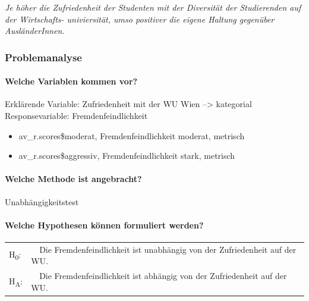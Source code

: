 \documentclass[]{article}
\providecommand{\tightlist}{%
  \setlength{\itemsep}{0pt}\setlength{\parskip}{0pt}}
\let\oldparagraph\paragraph
\renewcommand{\paragraph}[1]{\oldparagraph{#1}\mbox{}}
\begin{document}
\emph{Je höher die Zufriedenheit der Studenten mit der Diversität der
Studierenden auf der Wirtschafts- univiersität, umso positiver die
eigene Haltung gegenüber AusländerInnen.}

\subsubsection{Problemanalyse}\label{problemanalyse-1}

\paragraph{Welche Variablen kommen
vor?}\label{welche-variablen-kommen-vor-1}

Erklärende Variable: Zufriedenheit mit der WU Wien --\textgreater{}
kategorial Responsevariable: Fremdenfeindlichkeit

\begin{itemize}
\tightlist
\item
  av\_r.scores\$moderat, Fremdenfeindlichkeit moderat, metrisch\\
\item
  av\_r.scores\$aggressiv, Fremdenfeindlichkeit stark, metrisch
\end{itemize}

\paragraph{Welche Methode ist
angebracht?}\label{welche-methode-ist-angebracht-1}

Unabhängigkeitstest

\paragraph{Welche Hypothesen können formuliert
werden?}\label{welche-hypothesen-konnen-formuliert-werden-1}

\begin{longtable}[]{@{}ll@{}}
\toprule
\begin{minipage}[t]{0.13\columnwidth}\raggedright\strut
H\textsubscript{0}:\strut
\end{minipage} & \begin{minipage}[t]{0.81\columnwidth}\raggedright\strut
~~Die Fremdenfeindlichkeit ist unabhängig von der Zufriedenheit auf der
WU.\strut
\end{minipage}\tabularnewline
\begin{minipage}[t]{0.13\columnwidth}\raggedright\strut
H\textsubscript{A}:\strut
\end{minipage} & \begin{minipage}[t]{0.81\columnwidth}\raggedright\strut
~~Die Fremdenfeindlichkeit ist abhängig von der Zufriedenheit auf der
WU.\strut
\end{minipage}\tabularnewline
\bottomrule
\end{longtable}
\end{document}

